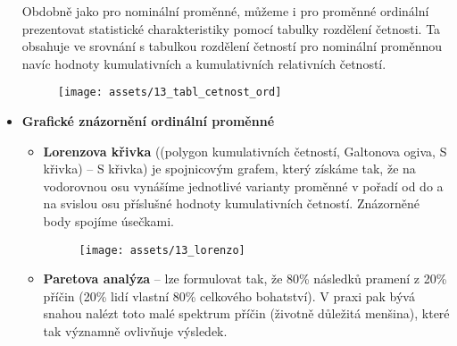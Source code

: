 \begin{itemize}
          Obdobně jako pro nominální proměnné, můžeme i pro proměnné ordinální prezentovat statistické charakteristiky pomocí tabulky rozdělení četnosti. Ta obsahuje ve srovnání s tabulkou rozdělení četností pro nominální proměnnou navíc hodnoty kumulativních a kumulativních relativních četností.
          \begin{figure}[H]
              \centering
              \texttt{[image: assets/13\_tabl\_cetnost\_ord]}
          \end{figure}
    \item \textbf{Grafické znázornění ordinální proměnné}
          \begin{itemize}
              \item \textbf{Lorenzova křivka} ((polygon kumulativních četností, Galtonova ogiva, S křivka) -- S křivka) je spojnicovým grafem, který získáme tak, že na vodorovnou osu vynášíme jednotlivé varianty proměnné v pořadí od  do  a na svislou osu příslušné hodnoty kumulativních četností. Znázorněné body spojíme úsečkami.
                    \begin{figure}[H]
                        \centering
                        \texttt{[image: assets/13\_lorenzo]}
                    \end{figure}
              \item \textbf{Paretova analýza} -- lze formulovat tak, že 80\% následků pramení z 20\% příčin (20\% lidí vlastní 80\% celkového bohatství). V praxi pak bývá snahou nalézt toto malé spektrum příčin (životně důležitá menšina), které tak významně ovlivňuje výsledek.
          \end{itemize}
\end{itemize}
